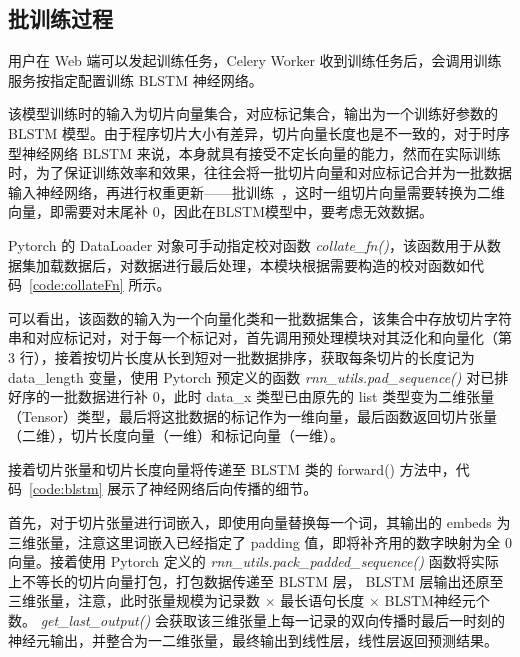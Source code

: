 \subsection{批训练过程}

用户在 Web 端可以发起训练任务，Celery Worker 收到训练任务后，会调用训练服务按指定配置训练 BLSTM 神经网络。

该模型训练时的输入为切片向量集合，对应标记集合，输出为一个训练好参数的 BLSTM 模型。由于程序切片大小有差异，切片向量长度也是不一致的，对于时序型神经网络 BLSTM 来说，本身就具有接受不定长向量的能力，然而在实际训练时，为了保证训练效率和效果，往往会将一批切片向量和对应标记合并为一批数据输入神经网络，再进行权重更新——批训练~\cite{imageNet,trainLonger,largeBatchLSTM}，这时一组切片向量需要转换为二维向量，即需要对末尾补 0，因此在BLSTM模型中，要考虑无效数据。

Pytorch 的 DataLoader 对象可手动指定校对函数 \textit{collate\_fn()}，该函数用于从数据集加载数据后，对数据进行最后处理，本模块根据需要构造的校对函数如代码~\ref{code:collateFn} 所示。

\begin{minipage}[!htbp]{0.9\textwidth}
    
\end{minipage}

可以看出，该函数的输入为一个向量化类和一批数据集合，该集合中存放切片字符串和对应标记对，对于每一个标记对，首先调用预处理模块对其泛化和向量化（第 3 行），接着按切片长度从长到短对一批数据排序，获取每条切片的长度记为 data\_length 变量，使用 Pytorch 预定义的函数 \textit{rnn\_utils.pad\_sequence()} 对已排好序的一批数据进行补 0，此时 data\_x 类型已由原先的 list 类型变为二维张量（Tensor）类型，最后将这批数据的标记作为一维向量，最后函数返回切片张量（二维），切片长度向量（一维）和标记向量（一维）。

接着切片张量和切片长度向量将传递至 BLSTM 类的 forward() 方法中，代码~\ref{code:blstm} 展示了神经网络后向传播的细节。

\begin{minipage}[!htbp]{0.9\textwidth}
    
\end{minipage}

首先，对于切片张量进行词嵌入，即使用向量替换每一个词，其输出的 embeds 为三维张量，注意这里词嵌入已经指定了 padding 值，即将补齐用的数字映射为全 0 向量。接着使用 Pytorch 定义的 \textit{rnn\_utils.pack\_padded\_sequence()} 函数将实际上不等长的切片向量打包，打包数据传递至 BLSTM 层， BLSTM 层输出还原至三维张量，注意，此时张量规模为记录数 $\times$ 最长语句长度 $\times$ BLSTM神经元个数。 \textit{get\_last\_output()} 会获取该三维张量上每一记录的双向传播时最后一时刻的神经元输出，并整合为一二维张量，最终输出到线性层，线性层返回预测结果。

